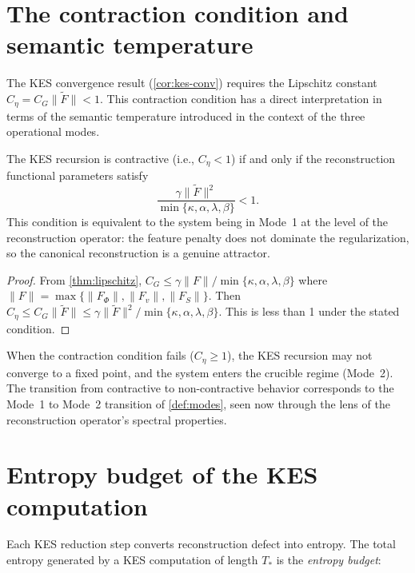\documentclass[12pt, oneside]{memoir}
\newcommand{\Ft}{\widetilde{F}}
\newcommand{\nnorm}[1]{\lVert #1 \rVert}
\begin{document}
\section{The contraction condition and semantic temperature}

The KES convergence result (\cref{cor:kes-conv}) requires the Lipschitz constant $C_\eta
= C_G \nnorm{\Ft} < 1$.  This contraction condition has a direct interpretation in terms
of the semantic temperature introduced in the context of the three operational modes.

\begin{proposition}
\label{prop:contraction-mode}
The KES recursion is contractive (i.e., $C_\eta < 1$) if and only if the reconstruction
functional parameters satisfy
\begin{equation}
  \frac{\gamma \nnorm{\Ft}^2}{\min\{\kappa,\alpha,\lambda,\beta\}} < 1.
\end{equation}
This condition is equivalent to the system being in Mode~1 at the level of the
reconstruction operator: the feature penalty does not dominate the regularization, so
the canonical reconstruction is a genuine attractor.
\end{proposition}

\begin{proof}
From \cref{thm:lipschitz}, $C_G \le \gamma \nnorm{F} / \min\{\kappa,\alpha,\lambda,\beta\}$
where $\nnorm{F} = \max\{\nnorm{F_\Phi}, \nnorm{F_v}, \nnorm{F_S}\}$.  Then $C_\eta \le
C_G \nnorm{\Ft} \le \gamma \nnorm{\Ft}^2 / \min\{\kappa,\alpha,\lambda,\beta\}$.  This
is less than 1 under the stated condition.
\end{proof}

When the contraction condition fails ($C_\eta \ge 1$), the KES recursion may not
converge to a fixed point, and the system enters the crucible regime (Mode~2).  The
transition from contractive to non-contractive behavior corresponds to the Mode~1 to
Mode~2 transition of \cref{def:modes}, seen now through the lens of the reconstruction
operator's spectral properties.

\section{Entropy budget of the KES computation}

Each KES reduction step converts reconstruction defect into entropy.  The total entropy
generated by a KES computation of length $T_*$ is the \emph{entropy budget}:
\end{document}
